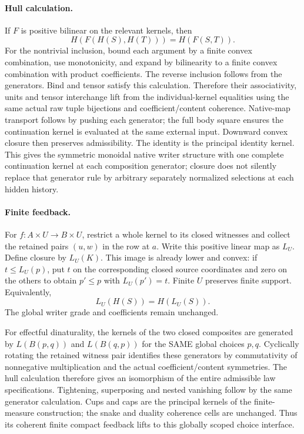 \documentclass{article}
\begin{document}
\paragraph{Hull calculation.} If $F$ is positive bilinear on the relevant kernels, then
\[H(F(H(S),H(T)))=H(F(S,T)).\]
For the nontrivial inclusion, bound each argument by a finite convex combination, use monotonicity, and expand by bilinearity to a finite convex combination with product coefficients. The reverse inclusion follows from the generators. Bind and tensor satisfy this calculation. Therefore their associativity, units and tensor interchange lift from the individual-kernel equalities using the same actual raw tuple bijections and coefficient/content coherence. Native-map transport follows by pushing each generator; the full body square ensures the continuation kernel is evaluated at the same external input. Downward convex closure then preserves admissibility. The identity is the principal identity kernel. This gives the symmetric monoidal native writer structure with one complete continuation kernel at each composition generator; closure does not silently replace that generator rule by arbitrary separately normalized selections at each hidden history.

\paragraph{Finite feedback.} For $f:A\times U\to B\times U$, restrict a whole kernel to its closed witnesses and collect the retained pairs $(u,w)$ in the row at $a$. Write this positive linear map as $L_U$. Define closure by $L_U(K)$. This image is already lower and convex: if $t\le L_U(p)$, put $t$ on the corresponding closed source coordinates and zero on the others to obtain $p'\le p$ with $L_U(p')=t$. Finite $U$ preserves finite support. Equivalently,
\[L_U(H(S))=H(L_U(S)).\]
The global writer grade and coefficients remain unchanged.

For effectful dinaturality, the kernels of the two closed composites are generated by $L(B(p,q))$ and $L(B(q,p))$ for the SAME global choices $p,q$. Cyclically rotating the retained witness pair identifies these generators by commutativity of nonnegative multiplication and the actual coefficient/content symmetries. The hull calculation therefore gives an isomorphism of the entire admissible law specifications. Tightening, superposing and nested vanishing follow by the same generator calculation. Cups and caps are the principal kernels of the finite-measure construction; the snake and duality coherence cells are unchanged. Thus its coherent finite compact feedback lifts to this globally scoped choice interface.
\end{document}
